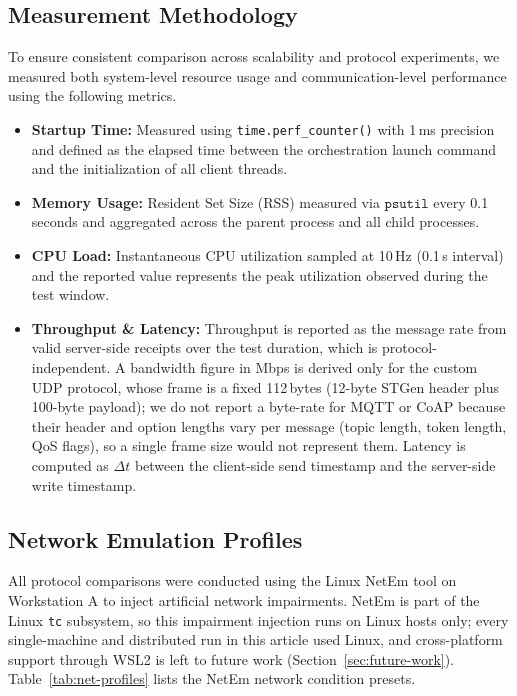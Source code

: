 \documentclass[jsan,article,submit,moreauthors,pdftex]{Definitions/mdpi}
\begin{document}
\subsection{Measurement Methodology}
To ensure consistent comparison across scalability and protocol experiments, we measured both system-level resource usage and communication-level performance using the following metrics.
\begin{itemize}
    \item \textbf{Startup Time:} Measured using \texttt{time.perf\_counter()} with 1\,ms precision and defined as the elapsed time between the orchestration launch command and the initialization of all client threads.
    \item \textbf{Memory Usage:} Resident Set Size (RSS) measured via $\texttt{psutil}$ every 0.1 seconds and aggregated across the parent process and all child processes.
    \item \textbf{CPU Load:} Instantaneous CPU utilization sampled at 10\,Hz (0.1\,s interval) and the reported value represents the peak utilization observed during the test window.
    \item \textbf{Throughput \& Latency:} Throughput is reported as the message rate from valid server-side receipts over the test duration, which is protocol-independent. A bandwidth figure in Mbps is derived only for the custom UDP protocol, whose frame is a fixed 112\,bytes (12-byte STGen header plus 100-byte payload); we do not report a byte-rate for MQTT or CoAP because their header and option lengths vary per message (topic length, token length, QoS flags), so a single frame size would not represent them. Latency is computed as $\Delta t$ between the client-side send timestamp and the server-side write timestamp.
\end{itemize}

\subsection{Network Emulation Profiles}
All protocol comparisons were conducted using the Linux NetEm tool \cite{hemminger2005network} on Workstation A to inject artificial network impairments. NetEm is part of the Linux \texttt{tc} subsystem, so this impairment injection runs on Linux hosts only; every single-machine and distributed run in this article used Linux, and cross-platform support through WSL2 is left to future work (Section~\ref{sec:future-work}). Table~\ref{tab:net-profiles} lists the NetEm network condition presets.
\end{document}
